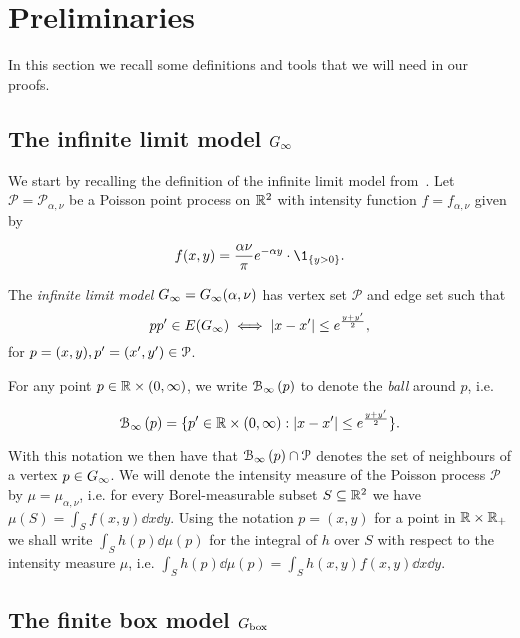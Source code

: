 
\section{Preliminaries\label{sec:proof_outline}}

In this section we recall some definitions and tools that we will need in our proofs.

\subsection{The infinite limit model \texorpdfstring{$G_{\infty}$}{G infinity}\label{ssec:infinite_model}}

We start by recalling the definition of the infinite limit model from~\cite{fountoulakis2018law}.
Let $\mathcal{P}=\mathcal{P}_{\alpha,\nu}$ be a Poisson point process on ${\mathbb R}^2$ with intensity function $f=f_{\alpha,\nu}$ given by

\begin{equation}\label{eq:def_intensity_function_f}
	f(x,y) = \frac{\alpha \nu}{\pi} e^{-\alpha y} \cdot \1_{\{y>0\}}.
\end{equation} 

The \emph{infinite limit model} $G_{\infty} = G_{\infty}(\alpha,\nu)$ has vertex set $\mathcal{P}$ and edge set such that
\[
	pp' \in E(G_{\infty}) \iff |x - x'| \leq e^{\frac{y + y'}{2}},
\]
for $p=(x,y),p'=(x',y')\in{\mathcal P}$.

For any point $p \in {\ensuremath{\mathbb R}} \times (0,\infty)$, we write ${\mathcal B}_{\infty}\left(p\right)$ to denote the \emph{ball} around $p$, i.e.

\begin{equation}\label{eq:def_ball_P}
	{\mathcal B}_{\infty}\left(p\right) = \{p^\prime \in {\mathbb R}\times(0,\infty) : |x - x^\prime| \leq e^{\frac{y + y^\prime}{2}}\}.
\end{equation}

With this notation we then have that ${\mathcal B}_{\infty}\left(p\right) \cap {\mathcal P}$ denotes the set of neighbours of a vertex $p \in G_{\infty}$.
We will denote the intensity measure of the Poisson process $\mathcal{P}$ by $\mu = \mu_{\alpha, \nu}$, i.e. for every 
Borel-measurable subset $S \subseteq {\mathbb R}^2$ we have $\mu(S) = \int_S f(x,y) \dd x \dd y$. Using the notation $p = (x,y)$ for a point in ${\mathbb R} \times {\ensuremath{\mathbb R}}_+$ we shall write $\int_S h(p) \dd \mu(p)$ for the integral of $h$ over $S$ with respect to the intensity measure $\mu$, i.e. $\int_S h(p) \dd \mu(p) = \int_{S} h(x,y) f(x,y) \dd x \dd y$.


\subsection{The finite box model \texorpdfstring{$G_{\mathrm{box}}$}{G box}\label{ssec:finite_model}}


